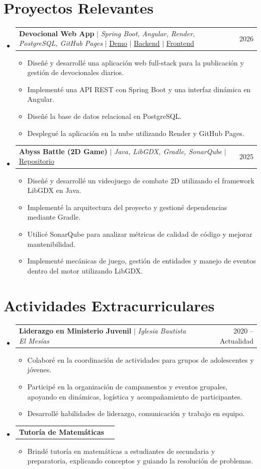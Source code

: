 \documentclass[letterpaper,12pt]{article}
\makeatletter
\newcommand{\resumeItem}[1]{
  \item\small{
    {#1 \vspace{-2pt}}
  }
}
\newcommand{\resumeProjectHeading}[2]{
    \item
    \begin{tabular*}{0.97\textwidth}{l@{\extracolsep{\fill}}r}
      \small#1 & #2 \\
    \end{tabular*}\vspace{-7pt}
}
\newcommand{\resumeSubHeadingListStart}{\begin{itemize}[leftmargin=0.15in, label={}]}
\newcommand{\resumeSubHeadingListEnd}{\end{itemize}}
\newcommand{\resumeItemListStart}{\begin{itemize}}
\newcommand{\resumeItemListEnd}{\end{itemize}\vspace{-5pt}}
\newcommand{\cvlink}[2]{\href{#1}{\underline{#2}}}
\makeatother
\begin{document}
\section{Proyectos Relevantes}
    \resumeSubHeadingListStart
    \resumeProjectHeading
        {\textbf{Devocional Web App} $|$ \emph{Spring Boot, Angular, Render, PostgreSQL, GitHub Pages} $|$
        \cvlink{https://jarethjaziel.github.io/Devo-app/}{Demo} $|$
        \cvlink{https://github.com/JarethJaziel/Devo-Service}{Backend} $|$
        \cvlink{https://github.com/JarethJaziel/Devo-app}{Frontend}}{2026}
          \resumeItemListStart
                \resumeItem{Diseñé y desarrollé una aplicación web full-stack para la publicación y gestión de devocionales diarios. }
                \resumeItem{Implementé una API REST con Spring Boot y una interfaz dinámica en Angular.}
                \resumeItem{Diseñé la base de datos relacional en PostgreSQL.}
                \resumeItem{Desplegué la aplicación en la nube utilizando Render y GitHub Pages.}
          \resumeItemListEnd
          
    
    \resumeProjectHeading
    {\textbf{Abyss Battle (2D Game)} $|$ \emph{Java, LibGDX, Gradle, SonarQube} $|$
    \cvlink{https://github.com/JarethJaziel/Abyss_Battle_Java_Game}{Repositorio}}{2025}
    \resumeItemListStart
        \resumeItem{Diseñé y desarrollé un videojuego de combate 2D utilizando el framework LibGDX en Java.}
        \resumeItem{Implementé la arquitectura del proyecto y gestioné dependencias mediante Gradle.}
        \resumeItem{Utilicé SonarQube para analizar métricas de calidad de código y mejorar mantenibilidad.}
        \resumeItem{Implementé mecánicas de juego, gestión de entidades y manejo de eventos dentro del motor utilizando LibGDX.}
    \resumeItemListEnd
    

    \resumeSubHeadingListEnd

\section{Actividades Extracurriculares}
    \resumeSubHeadingListStart
    \resumeProjectHeading
    {\textbf{Liderazgo en Ministerio Juvenil} $|$ \emph{Iglesia Bautista El Mesías}}{2020 -- Actualidad}
    \resumeItemListStart
        \resumeItem{Colaboré en la coordinación de actividades para grupos de adolescentes y jóvenes.}
        \resumeItem{Participé en la organización de campamentos y eventos grupales, apoyando en dinámicas, logística y acompañamiento de participantes.}
        \resumeItem{Desarrollé habilidades de liderazgo, comunicación y trabajo en equipo.}
    \resumeItemListEnd

    \resumeProjectHeading
    {\textbf{Tutoría de Matemáticas}}{}
    \resumeItemListStart
        \resumeItem{Brindé tutoría en matemáticas a estudiantes de secundaria y preparatoria, explicando conceptos y guiando la resolución de problemas.}
    \resumeItemListEnd
\resumeSubHeadingListEnd
\end{document}
